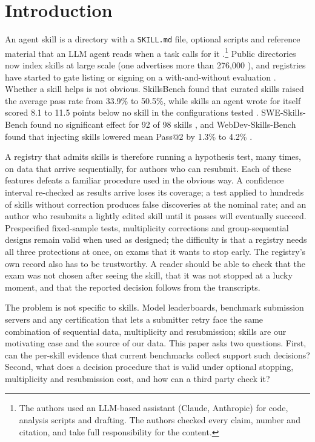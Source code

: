 \section{Introduction}

An agent skill is a directory with a \texttt{SKILL.md} file, optional scripts and reference material that an LLM agent reads when a task calls for it \citep{anthropic2025introducingskills,agentskills2026spec}.\footnote{The authors used an LLM-based assistant (Claude, Anthropic) for code, analysis scripts and drafting. The authors checked every claim, number and citation, and take full responsibility for the content.} Public directories now index skills at large scale (one advertises more than 276{,}000 \citep{agentskill2026}), and registries have started to gate listing or signing on a with-and-without evaluation \citep{nvidia2026trustpipeline,skillmill2026}. Whether a skill helps is not obvious. SkillsBench found that curated skills raised the average pass rate from 33.9\% to 50.5\%, while skills an agent wrote for itself scored 8.1 to 11.5 points below no skill in the configurations tested \citep{li2026skillsbench}. SWE-Skills-Bench found no significant effect for 92 of 98 skills \citep{han2026sweskillsbench}, and WebDev-Skills-Bench found that injecting skills lowered mean Pass@2 by 1.3\% to 4.2\% \citep{yang2026webdevskills}.

A registry that admits skills is therefore running a hypothesis test, many times, on data that arrive sequentially, for authors who can resubmit. Each of these features defeats a familiar procedure used in the obvious way. A confidence interval re-checked as results arrive loses its coverage; a test applied to hundreds of skills without correction produces false discoveries at the nominal rate; and an author who resubmits a lightly edited skill until it passes will eventually succeed. Prespecified fixed-sample tests, multiplicity corrections and group-sequential designs remain valid when used as designed; the difficulty is that a registry needs all three protections at once, on exams that it wants to stop early. The registry's own record also has to be trustworthy. A reader should be able to check that the exam was not chosen after seeing the skill, that it was not stopped at a lucky moment, and that the reported decision follows from the transcripts.

The problem is not specific to skills. Model leaderboards, benchmark submission servers and any certification that lets a submitter retry face the same combination of sequential data, multiplicity and resubmission; skills are our motivating case and the source of our data. This paper asks two questions. First, can the per-skill evidence that current benchmarks collect support such decisions? Second, what does a decision procedure that is valid under optional stopping, multiplicity and resubmission cost, and how can a third party check it?

